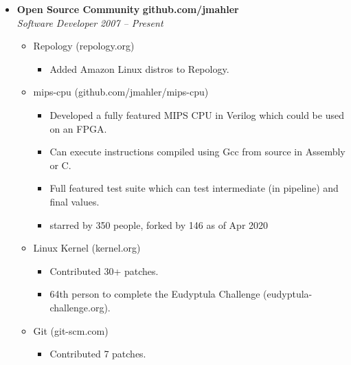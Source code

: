 \begin{itemize}
    \item
    \headerrow
        {\textbf{Open Source Community}}
        {\textbf{github.com/jmahler}}
    \\
    \headerrow
        {\emph{Software Developer}}
        {\emph{2007 -- Present}}
    \begin{itemize}
        \item Repology (repology.org)
			\begin{itemize}
			\item Added Amazon Linux distros to Repology.
			\end{itemize}
        \item mips-cpu (github.com/jmahler/mips-cpu)
            \begin{itemize}
            \item Developed a fully featured MIPS CPU in Verilog which
                could be used on an FPGA.
            \item Can execute instructions compiled using Gcc from
                source in Assembly or C.
            \item Full featured test suite which can test intermediate
                (in pipeline) and final values.
			\item starred by 350 people, forked by 146 as of Apr 2020
            \end{itemize}
        \item Linux Kernel (kernel.org)
            \begin{itemize}
            \item Contributed 30+ patches.
			\item 64th person to complete the Eudyptula Challenge
				(eudyptula-challenge.org).
            \end{itemize}
        \item Git (git-scm.com)
            \begin{itemize}
            \item Contributed 7 patches.
            \end{itemize}
    \end{itemize}
\end{itemize}
